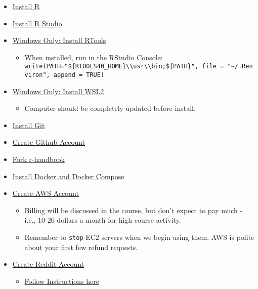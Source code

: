 \documentclass[
]{book}
\providecommand{\tightlist}{%
  \setlength{\itemsep}{0pt}\setlength{\parskip}{0pt}}
\begin{document}
\begin{itemize}
\item
  \href{https://cran.r-project.org/}{Install R}
\item
  \href{https://www.rstudio.com/products/rstudio/download/}{Install R Studio}
\item
  \href{https://cran.r-project.org/bin/windows/Rtools/}{Windows Only: Install RTools}

  \begin{itemize}
  \tightlist
  \item
    When installed, run in the RStudio Console: \texttt{write(\textquotesingle{}PATH="\$\{RTOOLS40\_HOME\}\textbackslash{}\textbackslash{}usr\textbackslash{}\textbackslash{}bin;\$\{PATH\}"\textquotesingle{},\ file\ =\ "\textasciitilde{}/.Renviron",\ append\ =\ TRUE)}
  \end{itemize}
\item
  \href{https://www.omgubuntu.co.uk/how-to-install-wsl2-on-windows-10}{Windows Only: Install WSL2}

  \begin{itemize}
  \tightlist
  \item
    Computer should be completely updated before install.
  \end{itemize}
\item
  \href{https://git-scm.com/downloads}{Install Git}
\item
  \href{https://github.com/}{Create Github Account}
\item
  \href{https://github.com/fdrennan/r-handbook}{Fork r-handbook}
\item
  \href{https://docs.docker.com/get-docker/}{Install Docker and Docker Compose}
\item
  \href{https://aws.amazon.com/}{Create AWS Account}

  \begin{itemize}
  \tightlist
  \item
    Billing will be discussed in the course, but don't expect to pay much - i.e., 10-20 dollars a month for high course activity.
  \item
    Remember to \texttt{stop} EC2 servers when we begin using them. AWS is polite about your first few refund requests.
  \end{itemize}
\item
  \href{reddit.com}{Create Reddit Account}

  \begin{itemize}
  \tightlist
  \item
    \href{https://towardsdatascience.com/how-to-use-the-reddit-api-in-python-5e05ddfd1e5c}{Follow Instructions here}
  \end{itemize}
\end{itemize}
\end{document}
